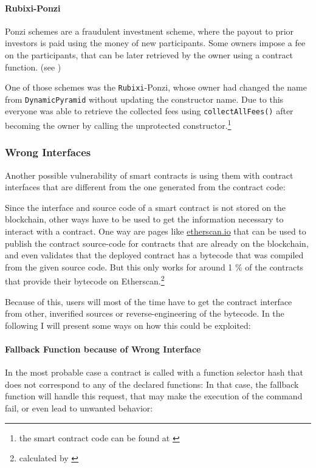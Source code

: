 \paragraph{Rubixi-Ponzi}
Ponzi schemes are a fraudulent investment scheme, where the payout to prior investors is paid using the money of new participants. Some owners impose a fee on the participants, that can be later retrieved by the owner using a contract function. (see \cite[section 4.4]{atzei:attacksurvey})

One of those schemes was the \texttt{Rubixi}-Ponzi, whose owner had changed the name from \texttt{Dynamic\-Py\-ra\-mid} without updating the constructor name. Due to this everyone was able to retrieve the collected fees using \texttt{collectAllFees()} after becoming the owner by calling the unprotected constructor.\footnote{the smart contract code can be found at \cite{etherscan:rubixi}}

\subsubsection{Wrong Interfaces}
Another possible vulnerability of smart contracts is using them with contract interfaces that are different from the one generated from the contract code:

Since the interface and source code of a smart contract is not stored on the blockchain, other ways have to be used to get the information necessary to interact with a contract. One way are pages like \url{etherscan.io} that can be used to publish the contract source-code for contracts that are already on the blockchain, and even validates that the deployed contract has a bytecode that was compiled from the given source code. But this only works for around 1 \% of the contracts that provide their bytecode on Etherscan.\footnote{calculated by \cite[Introduction]{nikolic:findingbadcontractsatscale}}

Because of this, users will most of the time have to get the contract interface from other, inverified sources or reverse-engineering of the bytecode. In the following I will present some ways on how this could be exploited:

\paragraph{Fallback Function because of Wrong Interface}
In the most probable case a contract is called with a function selector hash that does not correspond to any of the declared functions: In that case, the fallback function will handle this request, that may make the execution of the command fail, or even lead to unwanted behavior:

